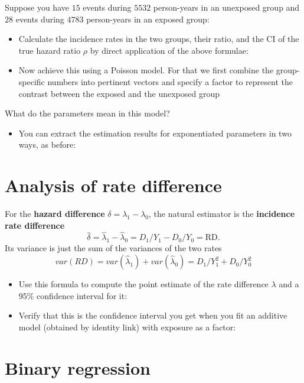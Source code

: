 \documentclass[
]{book}
\providecommand{\tightlist}{%
  \setlength{\itemsep}{0pt}\setlength{\parskip}{0pt}}
\begin{document}
Suppose you have \(15\) events during \(5532\) person-years in an
unexposed group and \(28\) events during \(4783\) person-years in an
exposed group:

\begin{itemize}
\item
  Calculate the incidence rates in the two groups, their ratio, and the CI of the true hazard ratio \(\rho\) by direct application of the above formulae:
\item
  Now achieve this using a Poisson model. For that we first combine
  the group-specific numbers into pertinent vectors and specify a factor to represent the contrast between the exposed and the unexposed group
\end{itemize}

What do the parameters mean in this model?

\begin{itemize}
\tightlist
\item
  You can extract the estimation results for exponentiated parameters in two ways, as before:
\end{itemize}

\section{Analysis of rate difference}\label{analysis-of-rate-difference}

For the \textbf{hazard difference} \(\delta = \lambda_1 - \lambda_0\),
the natural estimator is the \textbf{incidence rate difference}
\[ \widehat\delta = \widehat\lambda_1  - \widehat\lambda_0 = D_1/Y_1 - D_0/Y_0 = \mbox{RD} . \]
Its variance is just the sum of the variances of the two rates
\[ var(RD) = var(\widehat\lambda_1 ) + var( \widehat\lambda_0 ) =  D_1/Y_1^2 + D_0/Y_0^2 \]

\begin{itemize}
\item
  Use this formula to compute the point estimate of the rate difference \(\lambda\) and a 95\% confidence interval for it:
\item
  Verify that this is the confidence interval you get when you fit
  an additive model (obtained by identity link) with exposure as a factor:
\end{itemize}

\section{Binary regression}\label{binary-regression}
\end{document}
